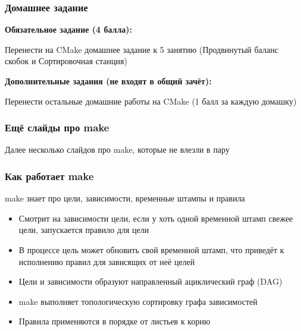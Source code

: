 \documentclass[aspectratio=169]{beamer}
\begin{document}
\begin{frame}
    \frametitle{Домашнее задание}

    \textbf{Обязательное задание (4 балла):}

    Перенести на CMake домашнее задание к 5 занятию (Продвинутый баланс скобок и Сортировочная станция)

    \vspace{1em}

    \textbf{Дополнительные задания (не входят в общий зачёт):}

    Перенести остальные домашние работы на CMake (1 балл за каждую домашку)

\end{frame}

\appendix

\begin{frame}
    \frametitle{Ещё слайды про make}

    Далее несколько слайдов про make, которые не влезли в пару

\end{frame}

\begin{frame}
    \frametitle{Как работает make}

    make знает про цели, зависимости, временные штампы и правила
    \begin{itemize}
        \item Смотрит на зависимости цели, если у хоть одной временной штамп свежее цели, запускается правило для цели
        \item В процессе цель может обновить свой временной штамп, что приведёт к исполнению правил для зависящих от неё целей
        \item Цели и зависимости образуют направленный ациклический граф (DAG)
        \item make выполняет топологическую сортировку графа зависимостей
        \item Правила применяются в порядке от листьев к корню
    \end{itemize}

\end{frame}
\end{document}
